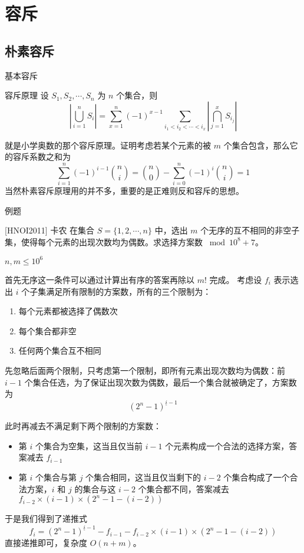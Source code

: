 \documentclass[UTF8]{beamer}
\begin{document}
    \section{容斥}
    \subsection{朴素容斥}
    \begin{frame}{基本容斥}
        \begin{block}{容斥原理}
            设 $S_1,S_2,\cdots, S_n$ 为 $n$ 个集合，则
            $$
            \left|\bigcup_{i=1}^n S_i \right| = \sum_{x=1}^n(-1)^{x-1}\sum_{i_1<i_2<\cdots<i_x}\left|\bigcap _{j=1}^xS_{i_j}\right|
            $$
        \end{block}
        就是小学奥数的那个容斥原理。证明考虑若某个元素的被 $m$ 个集合包含，那么它的容斥系数之和为
        $$
        \sum_{i=1}^n(-1)^{i-1}\binom ni = \binom n0-\sum_{i=0}^n(-1)^i\binom ni = 1 
        $$
        \pause
        当然朴素容斥原理用的并不多，重要的是正难则反和容斥的思想。
    \end{frame}
    \begin{frame}{例题}
        \begin{block}{[HNOI2011] 卡农}
            在集合 $S=\{1,2,\cdots,n\}$ 中，选出 $m$ 个无序的互不相同的非空子集，使得每个元素的出现次数均为偶数。求选择方案数 $\bmod 10^8+7$。
            
            $n, m \le 10^6$
        \end{block}
        \pause

        首先无序这一条件可以通过计算出有序的答案再除以 $m!$ 完成。
        考虑设 $f_i$ 表示选出 $i$ 个子集满足所有限制的方案数，所有的三个限制为：
        \begin{enumerate}
            \item 每个元素都被选择了偶数次
            \item 每个集合都非空
            \item 任何两个集合互不相同
        \end{enumerate}
    \end{frame}
    \begin{frame}
        先忽略后面两个限制，只考虑第一个限制，即所有元素出现次数均为偶数：前 $i-1$ 个集合任选，为了保证出现次数为偶数，最后一个集合就被确定了，方案数为
        $$
        (2^n-1)^{\underline i-1}
        $$
        \pause
        $\ $

        此时再减去不满足剩下两个限制的方案数：
        \begin{itemize}
            \item 第 $i$ 个集合为空集，这当且仅当前 $i-1$ 个元素构成一个合法的选择方案，答案减去 $f_{i-1}$
            \item 第 $i$ 个集合与第 $j$ 个集合相同，这当且仅当剩下的 $i-2$ 个集合构成了一个合法方案，$i$ 和 $j$ 的集合与这 $i-2$ 个集合都不同，答案减去 $f_{i-2}\times (i-1)\times (2^{n}-1-(i-2))$ 
        \end{itemize}
        于是我们得到了递推式
        $$
        f_i = (2^n-1)^{\underline i-1}-f_{i-1}-f_{i-2}\times (i-1)\times (2^{n}-1-(i-2))
        $$
        直接递推即可，复杂度 $O(n+m)$。
    \end{frame}
\end{document}
